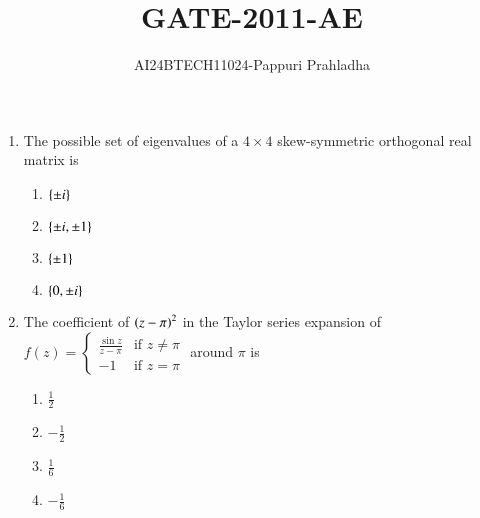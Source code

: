\documentclass[journal]{IEEEtran}
\begin{document}

\vspace{3cm}

\title{GATE-2011-AE}
\author{AI24BTECH11024-Pappuri Prahladha}
{\let\newpage\relax\maketitle}

\renewcommand{\thefigure}{\theenumi}
\renewcommand{\thetable}{\theenumi}
\setlength{\intextsep}{10pt} %


\renewcommand{\thetable}{\theenumi}
\begin{enumerate}
\item  The possible set of eigenvalues of a $ 4 \times 4 $ skew-symmetric orthogonal real matrix is
\begin{multicols}{4}
\begin{enumerate}
    \item $\left\{\pm i\right\}$ 
    \item $\left\{\pm i,\pm 1\right\}$
    \item $\left\{\pm 1\right\}$
    \item $\left\{0,\pm i\right\}$
\end{enumerate}
\end{multicols}
\item The coefficient of $ \left(z - \pi\right)^{2}$ in the Taylor series expansion of
$
		f(z) = \begin{cases} \frac{\sin z}{z - \pi} & \text{if}\,\,z \neq \pi \\ -1 & \text{if}\,\,z = \pi \end{cases}
$
around $\pi$ is
\begin{multicols}{4}
\begin{enumerate}
    \item $\frac{1}{2}$ 
    \item $ -\frac{1}{2} $
    \item $ \frac{1}{6}$ 
    \item $ -\frac{1}{6}$ 
\end{enumerate}
\end{multicols}

\end{enumerate}
\end{document}
